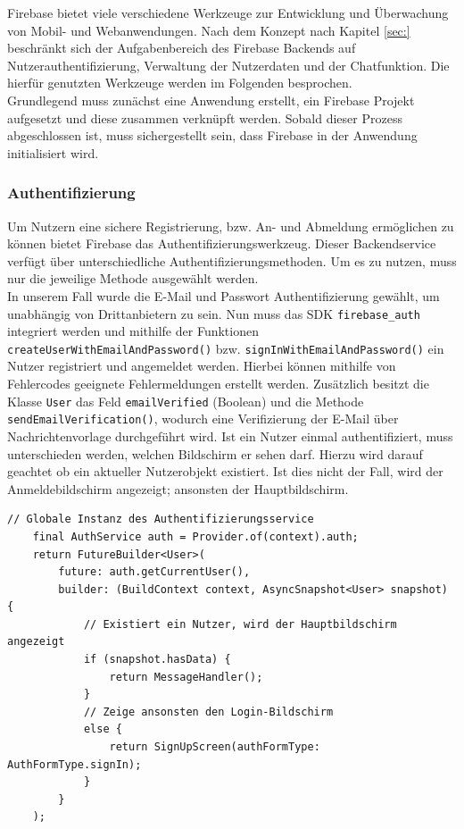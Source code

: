 Firebase bietet viele verschiedene Werkzeuge zur Entwicklung und Überwachung von Mobil- und Webanwendungen.
Nach dem Konzept nach Kapitel \ref{sec:} beschränkt sich der Aufgabenbereich des Firebase Backends auf Nutzerauthentifizierung, Verwaltung der Nutzerdaten und der Chatfunktion.
Die hierfür genutzten Werkzeuge werden im Folgenden besprochen.\\
Grundlegend muss zunächst eine Anwendung erstellt, ein Firebase Projekt aufgesetzt und diese zusammen verknüpft werden.
Sobald dieser Prozess abgeschlossen ist, muss sichergestellt sein, dass Firebase in der Anwendung initialisiert wird.

\subsubsection{Authentifizierung}
Um Nutzern eine sichere Registrierung, bzw. An- und Abmeldung ermöglichen zu können bietet Firebase das Authentifizierungswerkzeug. 
Dieser Backendservice verfügt über unterschiedliche Authentifizierungsmethoden.
Um es zu nutzen, muss nur die jeweilige Methode ausgewählt werden. \\

\noindent
In unserem Fall wurde die E-Mail und Passwort Authentifizierung gewählt, um unabhängig von Drittanbietern zu sein.
Nun muss das SDK \texttt{firebase\_auth} integriert werden und mithilfe der Funktionen \texttt{createUserWithEmailAndPassword()} bzw. \texttt{signInWithEmailAndPassword()} ein Nutzer registriert und angemeldet werden.
Hierbei können mithilfe von Fehlercodes geeignete Fehlermeldungen erstellt werden. 
Zusätzlich besitzt die Klasse \texttt{User} das Feld \texttt{emailVerified} (Boolean) und die Methode \texttt{sendEmailVerification()}, wodurch eine Verifizierung der E-Mail über Nachrichtenvorlage durchgeführt wird.
Ist ein Nutzer einmal authentifiziert, muss unterschieden werden, welchen Bildschirm er sehen darf.
Hierzu wird darauf geachtet ob ein aktueller Nutzerobjekt existiert.
Ist dies nicht der Fall, wird der Anmeldebildschirm angezeigt; ansonsten der Hauptbildschirm.
\medspace
\begin{lstlisting}[caption= Anzeige abhängig ob ein aktueller Nutzer existiert]
	// Globale Instanz des Authentifizierungsservice
	final AuthService auth = Provider.of(context).auth;
	return FutureBuilder<User>(
		future: auth.getCurrentUser(),
		builder: (BuildContext context, AsyncSnapshot<User> snapshot) {
			// Existiert ein Nutzer, wird der Hauptbildschirm angezeigt
			if (snapshot.hasData) {
				return MessageHandler();
			} 
			// Zeige ansonsten den Login-Bildschirm
			else {
				return SignUpScreen(authFormType: AuthFormType.signIn);
			}
		}
	);
\end{lstlisting}
\medspace

